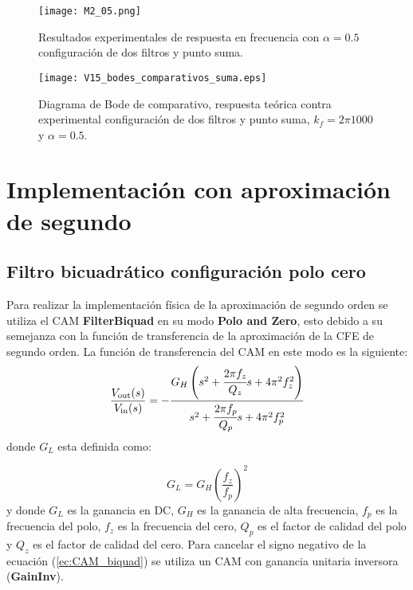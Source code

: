 	\begin{figure}[!ht] 
		\caption{Resultados experimentales de respuesta en frecuencia con $\alpha = 0.5$ configuración de dos filtros y punto suma.}
		\label{fig:M2_05}
		\centering
		\texttt{[image: M2\_05.png]}
	\end{figure}	
	
	\begin{figure}[!ht]
		\caption{Diagrama de Bode de comparativo, respuesta teórica contra experimental configuración de dos filtros y punto suma,  $k_{f} = 2\pi 1000$ y  $\alpha = 0.5$.} 
		\label{fig:V15_bodes_comparativos_suma}
		\centering
		\texttt{[image: V15\_bodes\_comparativos\_suma.eps]}
	\end{figure}	
	
	\section{Implementación con aproximación de segundo}
	
		\subsection{Filtro bicuadrático configuración polo cero}
	
	Para realizar la implementación física de la aproximación de segundo orden se utiliza el CAM \textbf{FilterBiquad} en su modo \textbf{Polo and Zero}, esto debido a su semejanza con la función de transferencia de la aproximación de la CFE de segundo orden. La función de transferencia del CAM en este modo es la siguiente:
	\begin{equation}
		\frac{V_{\mathrm{out}} (s)}{V_{\mathrm{in}}(s)} = - \frac{G_{H} \left(  s^{2} + \cfrac{2 \pi f_{z}}{Q_{z}} s + 4 \pi^{2} f_{z}^{2} \right)}{s^{2} + \cfrac{2 \pi f_{p}}{Q_{p}}s + 4\pi^{2} f_{p}^{2} }
		\label{ec:CAM_biquad}
	\end{equation}
	donde $G_{L}$  esta definida como:
	
	\begin{equation}
		G_{L} = G_{H} \left( \frac{f_{z}}{f_{p}} \right)^{2}
	\end{equation}
	y donde $G_{L}$ es la ganancia en DC, $G_{H}$ es la ganancia de alta frecuencia, $f_{p}$ es la frecuencia del polo, $f_{z}$ es la frecuencia del cero, $Q_{p}$ es el factor de calidad del polo y $Q_{z}$ es el factor de calidad del cero. Para cancelar el signo negativo de la ecuación (\ref{ec:CAM_biquad}) se utiliza un CAM con ganancia unitaria inversora (\textbf{GainInv}).
	
